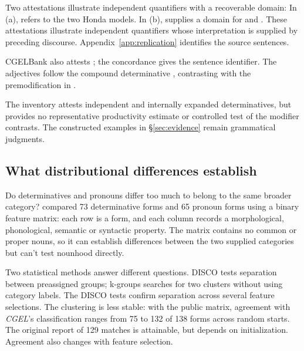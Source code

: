 \documentclass[12pt]{article}
\begin{document}
Two attestations illustrate independent quantifiers with a recoverable domain:
\ea\label{ex:attested-quantifiers}
\ea {}
\ex {}
\z\z
In (a),  refers to the two Honda models. In (b),  supplies a domain for  and . These attestations illustrate independent quantifiers whose interpretation is supplied by preceding discourse. Appendix~\ref{app:replication} identifies the source sentences.

CGELBank also attests ; the concordance gives the sentence identifier. The adjectives follow the compound determinative , contrasting with the premodification in .

The inventory attests independent and internally expanded determinatives, but provides no representative productivity estimate or controlled test of the modifier contrasts. The constructed examples in §\ref{sec:evidence} remain grammatical judgments.

\subsection{What distributional differences establish}

Do determinatives and pronouns differ too much to belong to the same broader category? \textcite{reynolds2021} compared 73 determinative forms and 65 pronoun forms using a binary feature matrix: each row is a form, and each column records a morphological, phonological, semantic or syntactic property. The matrix contains no common or proper nouns, so it can establish differences between the two supplied categories but can't test nounhood directly.

Two statistical methods answer different questions. DISCO tests separation between preassigned groups; k-groups searches for two clusters without using category labels. The DISCO tests confirm separation across several feature selections. The clustering is less stable: with the public matrix, agreement with \textit{CGEL}'s classification ranges from 75 to 132 of 138 forms across random starts. The original report of 129 matches is attainable, but depends on initialization. Agreement also changes with feature selection.
\end{document}
